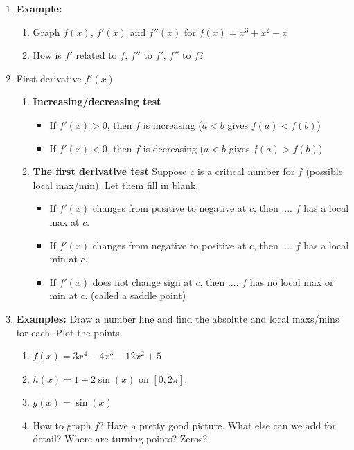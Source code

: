 \documentclass{article}
\begin{document}
\begin{enumerate}
\item {\bf Example:}
\begin{enumerate}
\item Graph $f(x)$, $f'(x)$ and $f''(x)$ for $f(x) = x^3+x^2-x$
\item How is $f'$ related to $f$, $f''$ to $f'$, $f''$ to $f$?
\end{enumerate}

\item First derivative $f'(x)$
\begin{enumerate}
\item {\bf Increasing/decreasing test}
\begin{itemize}
\item If $f'(x) >0$, then $f$ is increasing ($a<b$ gives $f(a)<f(b)$)
\item If $f'(x)<0$, then $f$ is decreasing ($a<b$ gives $f(a)>f(b)$)
\end{itemize}
\item {\bf The first derivative test} Suppose $c$ is a critical number for $f$ (possible local max/min). Let them fill in blank.
\begin{itemize}
\item If $f'(x)$ changes from positive to negative at $c$, then .... $f$ has a local max at $c$.
\item If $f'(x)$ changes from negative to positive at $c$, then .... $f$ has a local min at $c$.
\item If $f'(x)$ does not change sign at $c$, then .... $f$ has no local max or min at $c$.  (called a saddle point)
\end{itemize}
\end{enumerate}

\item  {\bf Examples: } Draw a number line and find the absolute and local maxs/mins for each. Plot the points.
\begin{enumerate}
\item $f(x) =3x^4-4x^3-12x^2+5$ 
\item $h(x) = 1+2\sin(x)$ on $[0,2\pi]$.
\item $g(x) = \sin(x)$ 
\item How to graph $f$? Have a pretty good picture. What else can we add for detail? Where are turning points? Zeros?
\end{enumerate}


\end{enumerate}
\end{document}
